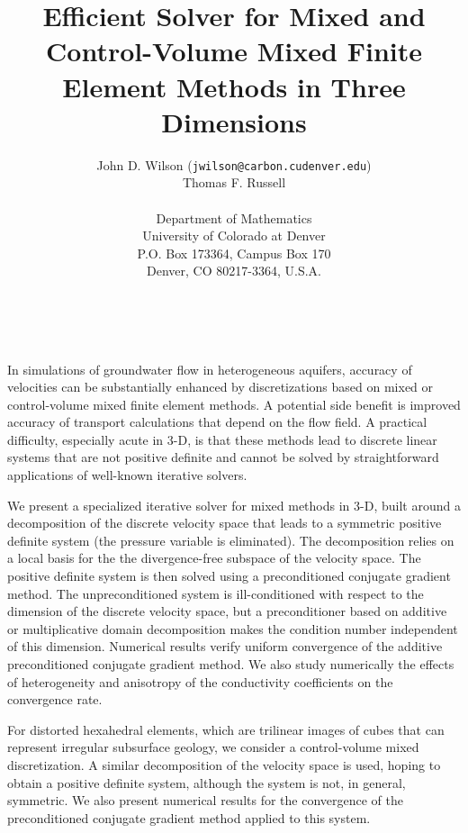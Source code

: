 \documentclass[11pt]{article}
\date{ ~ \hspace{-4mm}}
\title{Efficient Solver for Mixed and Control-Volume Mixed Finite Element Methods in Three Dimensions  }
\author{John D. Wilson ({\tt jwilson@carbon.cudenver.edu}) \\ Thomas F. Russell \\ \\ Department of Mathematics  \\  University of Colorado at Denver  \\  P.O. Box 173364, Campus Box 170  \\  Denver, CO 80217-3364, U.S.A.}
\begin{document}
\maketitle
\thispagestyle{empty}





 



In simulations of groundwater flow in heterogeneous aquifers, accuracy of
velocities can be substantially enhanced by discretizations based on mixed
or control-volume mixed finite element methods.  A potential side benefit is
improved accuracy of transport calculations that depend on the flow field.  
A practical difficulty, especially acute in 3-D, is that these methods lead
to discrete linear systems that are not positive definite and cannot be
solved by straightforward applications of well-known iterative solvers.

We present a specialized iterative solver for mixed methods in 3-D, built
around a decomposition of the discrete velocity space that leads to a
symmetric positive definite system (the pressure variable is eliminated).  
The decomposition relies on a local basis for the the divergence-free
subspace of the velocity space.  The positive definite system is then solved
using a preconditioned conjugate gradient method.  The unpreconditioned
system is ill-conditioned with respect to the dimension of the discrete
velocity space, but a preconditioner based on additive or multiplicative
domain decomposition makes the condition number independent of this
dimension.  Numerical results verify uniform convergence of the additive
preconditioned conjugate gradient method.  We also study numerically the
effects of heterogeneity and anisotropy of the conductivity coefficients on
the convergence rate.

For distorted hexahedral elements, which are trilinear images of cubes that
can represent irregular subsurface geology, we consider a control-volume
mixed discretization.  A similar decomposition of the velocity space is
used, hoping to obtain a positive definite system, although the system is
not, in general, symmetric.  We also present numerical results for the
convergence of the preconditioned conjugate gradient method applied to
this system.
\end{document}
